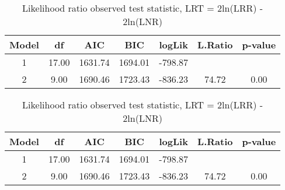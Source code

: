 \begin{table}[ht]
\centering
\caption{Likelihood ratio observed test statistic, LRT = 2ln(LRR) - 2ln(LNR)} 
\label{Table 1}
\begin{tabular}{ccccccc}
  \hline
Model & df & AIC & BIC & logLik & L.Ratio & p-value \\ 
  \hline
  1 & 17.00 & 1631.74 & 1694.01 & -798.87 &  &  \\ 
    2 & 9.00 & 1690.46 & 1723.43 & -836.23 & 74.72 & 0.00 \\ 
   \hline
\end{tabular}
\end{table}
\begin{table}[ht]
\centering
\caption{Likelihood ratio observed test statistic, LRT = 2ln(LRR) - 2ln(LNR)} 
\label{Table 1}
\begin{tabular}{ccccccc}
  \hline
Model & df & AIC & BIC & logLik & L.Ratio & p-value \\ 
  \hline
  1 & 17.00 & 1631.74 & 1694.01 & -798.87 &  &  \\ 
    2 & 9.00 & 1690.46 & 1723.43 & -836.23 & 74.72 & 0.00 \\ 
   \hline
\end{tabular}
\end{table}
